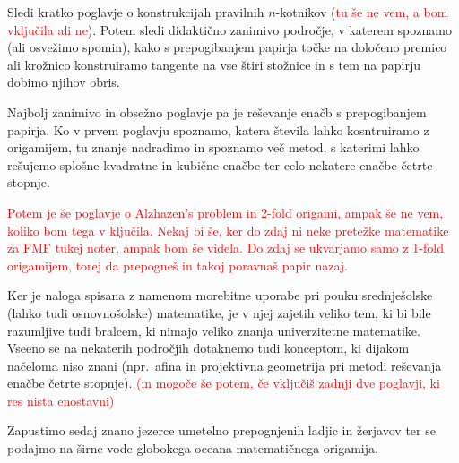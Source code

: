Sledi kratko poglavje o konstrukcijah pravilnih $n$-kotnikov (\textcolor{red}{tu še ne vem, a bom vključila ali ne}). Potem sledi didaktično zanimivo področje, v katerem spoznamo (ali osvežimo spomin), kako s prepogibanjem papirja točke na določeno premico ali krožnico konstruiramo tangente na vse štiri stožnice in s tem na papirju dobimo njihov obris.

Najbolj zanimivo in obsežno poglavje pa je reševanje enačb s prepogibanjem papirja. Ko v prvem poglavju spoznamo, katera števila lahko kosntruiramo z origamijem, tu znanje nadradimo in spoznamo več metod, s katerimi lahko rešujemo splošne kvadratne in kubične enačbe ter celo nekatere enačbe četrte stopnje.

\textcolor{red}{Potem je še poglavje o Alzhazen's problem in 2-fold origami, ampak še ne vem, koliko bom tega v ključila. Nekaj bi še, ker do zdaj ni neke pretežke matematike za FMF tukej noter, ampak bom še videla. Do zdaj se ukvarjamo samo z 1-fold origamijem, torej da prepogneš in takoj poravnaš papir nazaj.}

Ker je naloga spisana z namenom morebitne uporabe pri pouku srednješolske (lahko tudi osnovnošolske) matematike, je v njej zajetih veliko tem, ki bi bile razumljive tudi bralcem, ki nimajo veliko znanja univerzitetne matematike. Vseeno se na nekaterih področjih dotaknemo tudi konceptom, ki dijakom načeloma niso znani (npr.\ afina in projektivna geometrija pri metodi reševanja enačbe četrte stopnje). \textcolor{red}{(in mogoče še potem, če vključiš zadnji dve poglavji, ki res nista enostavni)}

Zapustimo sedaj znano jezerce umetelno prepognjenih ladjic in žerjavov ter se podajmo na širne vode globokega oceana matematičnega origamija.